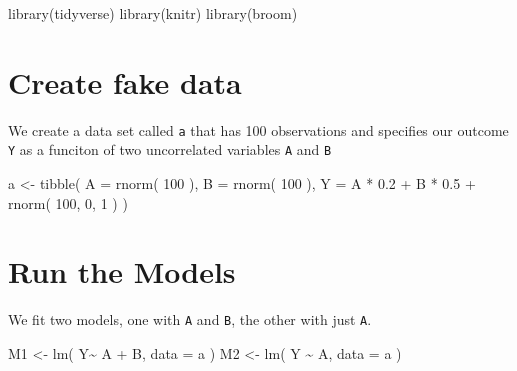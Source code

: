 \documentclass[
  letterpaper,
  DIV=11,
  numbers=noendperiod]{scrreprt}
\newenvironment{Shaded}{\begin{snugshade}}{\end{snugshade}}
\newcommand{\AttributeTok}[1]{\textcolor[rgb]{0.49,0.56,0.16}{#1}}
\newcommand{\DecValTok}[1]{\textcolor[rgb]{0.25,0.63,0.44}{#1}}
\newcommand{\FloatTok}[1]{\textcolor[rgb]{0.25,0.63,0.44}{#1}}
\newcommand{\FunctionTok}[1]{\textcolor[rgb]{0.02,0.16,0.49}{#1}}
\newcommand{\NormalTok}[1]{\textcolor[rgb]{0.00,0.44,0.13}{#1}}
\newcommand{\OtherTok}[1]{\textcolor[rgb]{0.00,0.44,0.13}{#1}}
\newcommand{\SpecialCharTok}[1]{\textcolor[rgb]{0.25,0.44,0.63}{#1}}
\begin{document}
\begin{Shaded}
\begin{Highlighting}[]
\FunctionTok{library}\NormalTok{(tidyverse)}
\FunctionTok{library}\NormalTok{(knitr)}
\FunctionTok{library}\NormalTok{(broom)}
\end{Highlighting}
\end{Shaded}

\hypertarget{create-fake-data}{%
\section{Create fake data}\label{create-fake-data}}

We create a data set called \texttt{a} that has 100 observations and
specifies our outcome \texttt{Y} as a funciton of two uncorrelated
variables \texttt{A} and \texttt{B}

\begin{Shaded}
\begin{Highlighting}[]
\NormalTok{a }\OtherTok{\textless{}{-}} \FunctionTok{tibble}\NormalTok{( }\AttributeTok{A =} \FunctionTok{rnorm}\NormalTok{( }\DecValTok{100}\NormalTok{ ),}
            \AttributeTok{B =} \FunctionTok{rnorm}\NormalTok{( }\DecValTok{100}\NormalTok{ ),}
            \AttributeTok{Y =}\NormalTok{ A }\SpecialCharTok{*} \FloatTok{0.2} \SpecialCharTok{+}\NormalTok{ B }\SpecialCharTok{*} \FloatTok{0.5} \SpecialCharTok{+} \FunctionTok{rnorm}\NormalTok{( }\DecValTok{100}\NormalTok{, }\DecValTok{0}\NormalTok{, }\DecValTok{1}\NormalTok{ ) )}
\end{Highlighting}
\end{Shaded}

\hypertarget{run-the-models}{%
\section{Run the Models}\label{run-the-models}}

We fit two models, one with \texttt{A} and \texttt{B}, the other with
just \texttt{A}.

\begin{Shaded}
\begin{Highlighting}[]
\NormalTok{M1 }\OtherTok{\textless{}{-}} \FunctionTok{lm}\NormalTok{( Y}\SpecialCharTok{\textasciitilde{}}\NormalTok{ A }\SpecialCharTok{+}\NormalTok{ B, }\AttributeTok{data =}\NormalTok{ a )}
\NormalTok{M2 }\OtherTok{\textless{}{-}} \FunctionTok{lm}\NormalTok{( Y }\SpecialCharTok{\textasciitilde{}}\NormalTok{ A, }\AttributeTok{data =}\NormalTok{ a )}
\end{Highlighting}
\end{Shaded}
\end{document}
